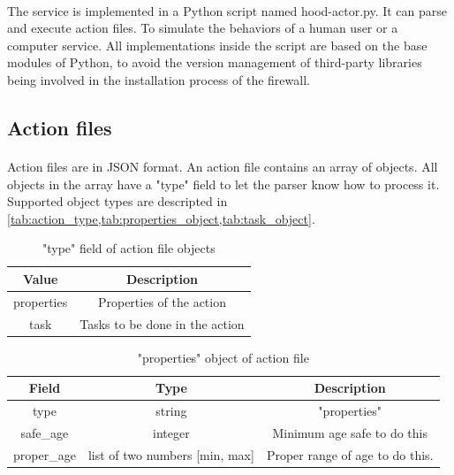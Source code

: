 \documentclass[mscthesis]{usiinfthesis}
\begin{document}
\paragraph{}
The service is implemented in a Python script named hood-actor.py. It can parse and execute action files. To simulate the behaviors of a human user or a computer service. All implementations inside the script are based on the base modules of Python, to avoid the version management of third-party libraries being involved in the installation process of the firewall.

\subsection{Action files}
\paragraph{}
Action files are in JSON format. An action file contains an array of objects. All objects in the array have a "type" field to let the parser know how to process it. Supported object types are descripted in \cref{tab:action_type,tab:properties_object,tab:task_object}.

\begin{table}[H]
  \centering
  \begin{tabular}{|c|c|}
    \hline
    Value      & Description                    \\
    \hline
    properties & Properties of the action       \\
    task       & Tasks to be done in the action \\
    \hline
  \end{tabular}
  \caption{"type" field of action file objects}
  \label{tab:action_type}
\end{table}


\begin{table}[H]
  \centering
  \begin{tabular}{|c|c|c|}
    \hline
    Field       & Type                           & Description                     \\
    \hline
    type        & string                         & "properties"                    \\
    safe\_age   & integer                        & Minimum age safe to do this     \\
    proper\_age & list of two numbers [min, max] & Proper range of age to do this. \\
    \hline
  \end{tabular}
  \caption{"properties" object of action file}
  \label{tab:properties_object}
\end{table}
\end{document}
